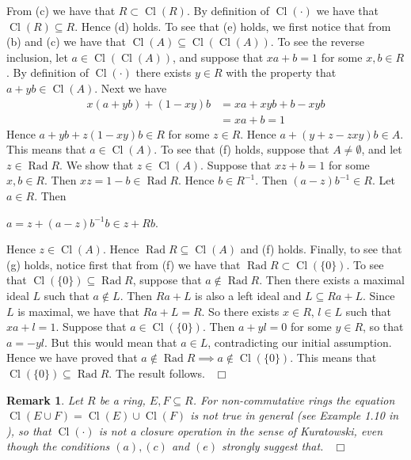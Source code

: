 \documentclass[12pt, oneside]{book}
\newtheorem{remark}[theorem]{Remark}
\newcommand{\qed}{\hfill ~$\Box$\\}
\def\Rad{\operatorname{Rad}}
\def\Cl{\operatorname{Cl}}
\begin{document}
\vskip 0.3cm
\noindent From (c) we have that $R \subset \Cl(R)$. By definition of $\Cl(\cdot)$ we have 
that $\Cl(R) \subseteq R$. Hence (d) holds.
\vskip 0.3cm
\noindent To see that (e) holds, we first notice that from (b) and (c) we have that 
$\Cl(A) \subseteq \Cl(\Cl(A))$. To see the reverse inclusion, let $a \in \Cl(\Cl(A))$, and 
suppose that $xa + b = 1$ for some $x, b \in R$. By definition of $\Cl(\cdot)$ there exists 
$y \in R$ with the property that $a + yb \in \Cl(A).$ Next we have
\begin{align*}
x(a + yb) + (1-xy)b
&= xa + xyb + b -xyb\\
&= xa + b = 1
\end{align*}
Hence $a + yb + z(1 -xy)b \in R$ for some $z \in R$. Hence $a + (y + z - zxy)b \in A$. 
This means that $a \in \Cl(A)$.
\vskip 0.3cm
\noindent To see that (f) holds, suppose that $A \neq \emptyset$, and let $z \in \Rad R$. 
We show that $z \in \Cl(A)$. Suppose that $xz + b = 1$ for some $x, b \in R$. 
Then $xz = 1 - b \in \Rad R$. Hence $b \in R^{-1}$. Then $(a - z)b^{-1} \in R$. Let $a \in R$. 
Then
\begin{center}
$a = z + (a - z)b^{-1}b \in z + Rb$.
\end{center}
Hence $z \in \Cl(A).$ Hence $\Rad R \subseteq \Cl(A)$ and (f) holds.
\vskip 0.3cm
\noindent Finally, to see that (g) holds, notice first that from (f) we have that 
$\Rad R \subset \Cl(\{0\})$. To see that $\Cl(\{0\}) \subseteq \Rad R$, suppose that 
$a \notin \Rad R$. Then there exists a maximal ideal $L$ such that $a \notin L$. 
Then $Ra + L$ is also a left ideal and $L \subseteq Ra + L$. Since $L$ is maximal, we have that 
$Ra + L = R$. So there exists $x \in R$, $l \in L$ such that $xa + l = 1$. 
Suppose that $a \in \Cl(\{0\})$. Then $a + yl = 0$ for some $y \in R$, so that $a = -yl$. 
But this would mean that $a \in L$, contradicting our initial assumption. Hence we have proved that $a \notin \Rad R \implies a \notin \Cl(\{0\})$. This means that $\Cl(\{0\}) \subseteq \Rad R.$ The result follows. \qed
\begin{remark} \label{NotKuratowski}
\normalfont
\noindent Let $R$ be a ring, $E, F \subseteq R$. For non-commutative rings the equation 
$\Cl(E \cup F) = \Cl(E) \cup \Cl(F)$ is not true in general (see Example 1.10 in \cite{APP2}), 
so that $\Cl(\cdot)$ is not a closure operation in the sense of Kuratowski, even though the
conditions $(a), (c)$ and $(e)$ strongly suggest that. 
\qed
\end{remark}

\vskip 2cm
\begin{center}
\maltese
\end{center}
\end{document}
